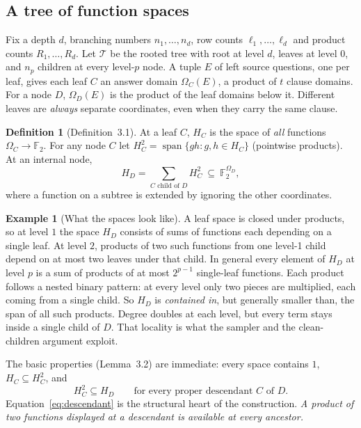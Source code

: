 \documentclass[11pt]{article}
\theoremstyle{definition}
\newtheorem{definition}[theorem]{Definition}
\newtheorem{example}[theorem]{Example}
\theoremstyle{remark}
\DeclareMathOperator{\Span}{span}
\newcommand{\Fb}{\mathbb F_2}
\newcommand{\cT}{\mathcal T}
\begin{document}
\subsection{A tree of function spaces}\label{sec:tree}

Fix a depth $d$, branching numbers $n_1,\ldots,n_d$, row counts
$\ell_1,\ldots,\ell_d$ and product counts $R_1,\ldots,R_d$. Let $\cT$ be the
rooted tree with root at level $d$, leaves at level $0$, and $n_p$ children at
every level-$p$ node. A tuple $E$ of left source questions, one per leaf,
gives each leaf $C$ an answer domain $\Omega_C(E)$, a product of $t$ clause
domains. For a node $D$, $\Omega_D(E)$ is the product of the leaf domains below
it. Different leaves are \emph{always} separate coordinates, even when they
carry the same clause.

\begin{definition}[Definition~3.1]\label{def:spaces}
At a leaf $C$, $H_C$ is the space of \emph{all} functions $\Omega_C\to\Fb$.
For any node $C$ let $H_C^2=\Span\{gh:g,h\in H_C\}$ (pointwise products).
At an internal node,
\[
 H_D=\sum_{C\text{ child of }D}H_C^2\ \subseteq\ \Fb^{\Omega_D},
\]
where a function on a subtree is extended by ignoring the other coordinates.
\end{definition}

\begin{example}[What the spaces look like]
A leaf space is closed under products, so at level $1$ the space $H_D$
consists of sums of functions each depending on a single leaf. At level $2$,
products of two such functions from one level-1 child depend on at most two
leaves under that child. In general every element of $H_D$ at level $p$ is a
sum of products of at most $2^{p-1}$ single-leaf functions. Each product
follows a nested binary pattern: at every level only two pieces are
multiplied, each coming from a single child. So $H_D$ is \emph{contained in},
but generally smaller than, the span of all such products. Degree doubles at
each level, but every term stays inside a single child of $D$. That locality
is what the sampler and the clean-children argument exploit.
\end{example}

The basic properties (Lemma~3.2) are immediate: every space contains $1$,
$H_C\subseteq H_C^2$, and
\begin{equation}\label{eq:descendant}
 H_C^2\subseteq H_D\qquad\text{for every proper descendant $C$ of $D$}.
\end{equation}
Equation~\eqref{eq:descendant} is the structural heart of the construction.
\emph{A product of two functions displayed at a descendant is available at
every ancestor.}
\end{document}

